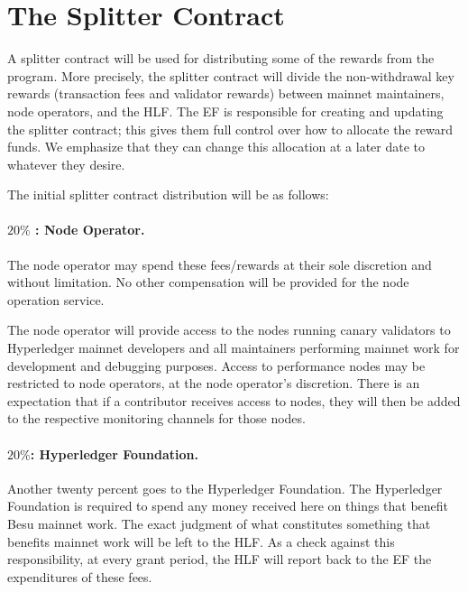 
\section{The Splitter Contract} \label{sec:splitter}
A splitter contract will be used for distributing some of the rewards from the program.  More precisely, the splitter contract will divide the non-withdrawal key rewards (transaction fees and validator rewards) between mainnet maintainers, node operators, and the HLF.  The EF is responsible for creating and updating the splitter contract; this gives them full control over how to allocate the reward funds.  We emphasize that they can change this allocation at a later date to whatever they desire.

The initial splitter contract distribution will be as follows:

\paragraph{$20\%$ : \textbf{Node Operator}.}  The node operator may spend these fees/rewards at their sole discretion and without limitation. No other compensation will be provided for the node operation service.

The node operator will provide access to the nodes running canary validators to Hyperledger mainnet developers and all maintainers performing mainnet work for development and debugging purposes. Access to performance nodes may be restricted to node operators, at the node operator’s discretion. There is an expectation that if a contributor receives access to nodes, they will then be added to the respective monitoring channels for those nodes.

\paragraph{$20\%$:  \textbf{Hyperledger Foundation}.}  Another twenty percent goes to the Hyperledger Foundation.  The Hyperledger Foundation is required to spend any money received here on things that benefit Besu mainnet work.  The exact judgment of what constitutes something that benefits mainnet work will be left to the HLF.  As a check against this responsibility, at every grant period, the HLF will report back to the EF the expenditures of these fees.

